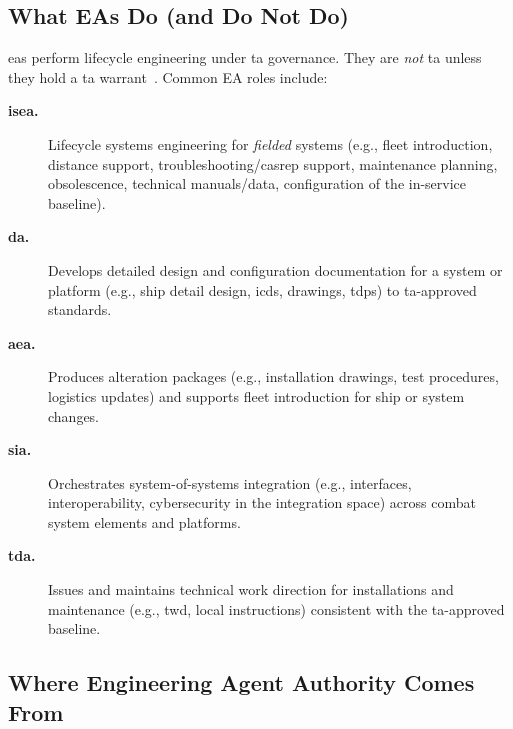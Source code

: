 \documentclass[../main.tex]{subfiles}
\begin{document}
\subsection{What EAs Do (and Do Not Do)}

\acp{ea} perform lifecycle engineering under \ac{ta} governance. They are \emph{not} \ac{ta} unless they hold a \ac{ta} warrant~\autocite{edo-2-1-5-technical-authority-2025}. Common EA roles include:
\begin{description}
	\item[\textbf{\ac{isea}.}] Lifecycle systems engineering for \emph{fielded} systems (e.g., fleet introduction, distance support, troubleshooting/\ac{casrep} support, maintenance planning, obsolescence, technical manuals/data, configuration of the in-service baseline).
	\item[\textbf{\ac{da}.}] Develops detailed design and configuration documentation for a system or platform (e.g., ship detail design, \acp{icd}, drawings, \acp{tdp}) to \ac{ta}-approved standards.
	\item[\textbf{\ac{aea}.}] Produces alteration packages (e.g., installation drawings, test procedures, logistics updates) and supports fleet introduction for ship or system changes.
	\item[\textbf{\ac{sia}.}] Orchestrates system-of-systems integration (e.g., interfaces, interoperability, cybersecurity in the integration space) across combat system elements and platforms.
	\item[\textbf{\ac{tda}.}] Issues and maintains technical work direction for installations and maintenance (e.g., \ac{twd}, local instructions) consistent with the \ac{ta}-approved baseline.
\end{description}

\subsection{Where Engineering Agent Authority Comes From}
\end{document}

